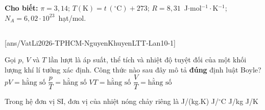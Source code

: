 \def\CheDo{solcolor}%
\def\tenchuong{Nguyễn Khuyến -- Lê Thánh Tông, TP HCM -- Lần 10}
\def\thuonghieu{VẬT LÍ 12 -- Eduzy.com.vn}
\def\TachCauDS{1}
\def\TachCauLG{1}




	\noindent\textbf{Cho biết:} $\pi=3{,}14$; $T(\text{K})=t\,(^\circ\text{C})+273$; $R=8{,}31$~J$\cdot$mol$^{-1}\cdot$K$^{-1}$; $N_A=6{,}02\cdot 10^{23}$~hạt/mol.

	\noindent
	\subsection*{}
	\setcounter{ex}{0}
	[ans/VatLi2026-TPHCM-NguyenKhuyenLTT-Lan10-1]

	\begin{ex}%
		Gọi $p$, $V$ và $T$ lần lượt là áp suất, thể tích và nhiệt độ tuyệt đối của một khối lượng khí lí tưởng xác định. Công thức nào sau đây mô tả \textbf{đúng} định luật Boyle?
		\choice
		{\True $pV=\text{hằng số}$}
		{$\dfrac{p}{T}=\text{hằng số}$}
		{$VT=\text{hằng số}$}
		{$\dfrac{V}{T}=\text{hằng số}$}
	\end{ex}

	\begin{ex}%
		Trong hệ đơn vị SI, đơn vị của nhiệt nóng chảy riêng là
		\choice
		{J/(kg.K)}
		{J/$^\circ$C}
		{\True J/kg}
		{J/K}
	\end{ex}

